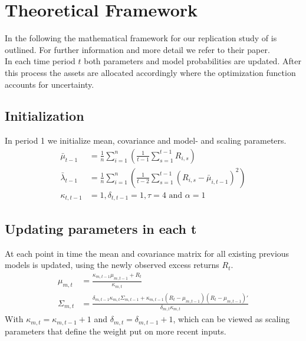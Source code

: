 \section{Theoretical Framework}\label{methodology}
In the following the mathematical framework for our replication study of \cite{anderson_cheng_2016} is outlined. For further information and more detail we refer to their paper. \\
In each time period $t$ both parameters and model probabilities are updated. After this process the assets are allocated accordingly where the optimization function accounts for uncertainty.
\subsection{Initialization}
In period 1 we initialize mean, covariance and model- and scaling parameters.
\begin{align*}
\bar\mu_{t-1} &= \frac{1}{n}\sum_{i=1}^{n}(\frac{1}{t-1}\sum_{s=1}^{t-1} R_{i,s})\\
\bar \lambda_{t-1} &= \frac{1}{n}\sum_{i=1}^{n}(\frac{1}{t-2}\sum_{s=1}^{t-1}(R_{i,s}-\bar\mu_{i,t-1})^2)\\
 \kappa_{t,t-1} &= 1,  \delta_{t,t-1} = 1, \tau = 4 \text{ and } \alpha = 1
\end{align*}
\subsection{Updating parameters in each t}
At each point in time the mean and covariance matrix for all existing previous models is updated, using the newly observed excess returns $R_t$.
\begin{align*}
\mu_{m,t} &= \frac{\kappa_{m,t-1}\mu_{m,t-1} + R_t}{\kappa_{m,t}}\\
\Sigma_{m,t} &= \frac{\delta_{m,t-1}\kappa_{m,t}\Sigma_{m,t-1}+\kappa_{m,t-1}(R_t - \mu_{m,t-1} )(R_t - \mu_{m,t-1})'}{\delta_{m,t}\kappa_{m,t}}
\end{align*}
With $\kappa_{m,t} = \kappa_{m,t-1} + 1$ and $\delta_{m,t} =\delta_{m,t-1} + 1 $, which can be viewed as scaling parameters that define the weight put on more recent inputs.


